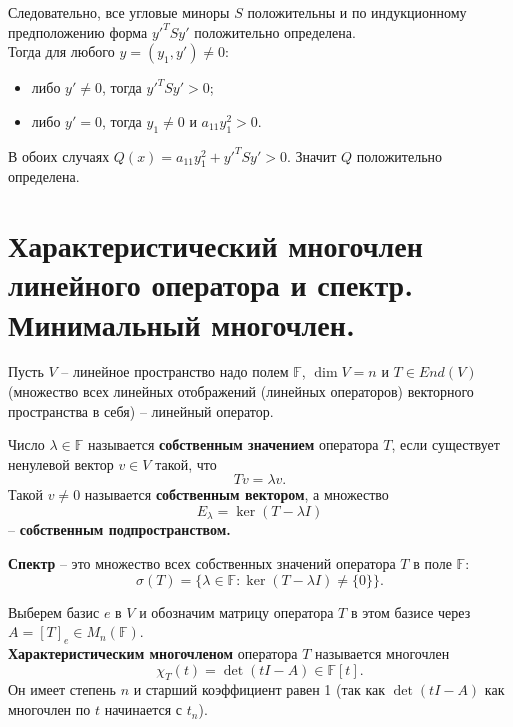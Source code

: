 \documentclass[14pt]{extreport}
\begin{document}
\begin{prbox}
\[        \]
        Следовательно, все угловые миноры $S$ положительны и по индукционному предположению форма $y'^TSy'$ положительно определена.\\
        Тогда для любого $y = (y_1,y') \neq 0$:
        \begin{itemize}
            \item либо $y' \neq 0$, тогда $y'^TSy' >0$;
            \item либо $y' = 0$, тогда $y_1 \neq 0$ и $a_{11}y_1^2 > 0$.
        \end{itemize}
        В обоих случаях $Q(x) = a_{11}y_1^2 + y'^TSy' > 0$. Значит $Q$ положительно определена.
    \end{prbox}



    \chapter{Характеристический многочлен линейного оператора и спектр. Минимальный многочлен.}

    \begin{defbox}
        Пусть $V$ – линейное пространство надо полем $\mathbb{F}$, $\dim V = n$ и $T \in End(V)$ (множество всех линейных отображений (линейных операторов) векторного пространства в себя) – линейный оператор.

        Число $\lambda \in \mathbb{F}$ называется \textbf{собственным значением} оператора $T$, если существует ненулевой вектор $v \in V$ такой, что 
        \[
        Tv = \lambda v.
        \]
        Такой $v \neq 0$ называется \textbf{собственным вектором}, а множество
        \[
        E_\lambda = \ker (T - \lambda I)
        \]
        – \textbf{собственным подпространством.}

        \textbf{Спектр} – это множество всех собственных значений оператора $T$ в поле $\mathbb{F}$:
        \[
        \sigma(T) = \{ \lambda \in \mathbb{F}: \ker(T - \lambda I) \neq \{0\} \}.
        \]
    \end{defbox}

    \begin{defbox}
        Выберем базис $e$ в $V$ и обозначим матрицу оператора $T$ в этом базисе через $A = [T]_e \in M_n(\mathbb{F})$.\\
        \textbf{Характеристическим многочленом} оператора $T$ называется многочлен
        \[
        \chi_T(t) = \det(tI-A) \in \mathbb{F}[t].
        \]
        Он имеет степень $n$ и старший коэффициент равен 1 (так как $\det(tI-A)$ как многочлен по $t$ начинается с $t_n$).
    \end{defbox}
\end{document}
